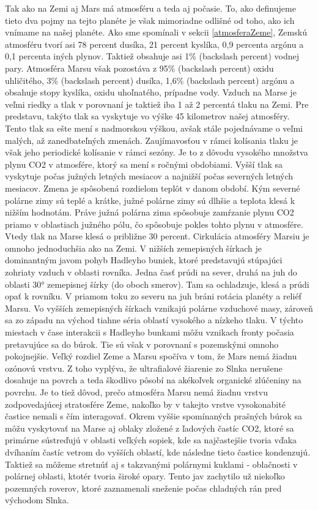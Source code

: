 Tak ako na Zemi aj Mars má atmosféru a teda aj počasie. To, ako definujeme tieto dva pojmy na tejto planéte je však mimoriadne odlišné od toho, ako ich vnímame na našej planéte. Ako sme spomínali v sekcii \ref{atmosferaZeme}, Zemskú atmosféru tvorí asi 78 percent dusíka, 21 percent kyslíka, 0,9 percenta argónu a 0,1 percenta iných plynov. Taktiež obsahuje asi 1\% (backslash percent) vodnej pary. Atmosféra Marsu však pozostáva z 95\% (backslash percent) oxidu uhličitého, 3\% (backslash percent) dusíka, 1,6\% (backslash percent) argónu a obsahuje stopy kyslíka, oxidu uhoľnatého, prípadne vody. Vzduch na Marse je veľmi riedky a tlak v porovnaní je taktiež iba 1 až 2 percentá tlaku na Zemi. Pre predstavu, takýto tlak sa vyskytuje vo výške 45 kilometrov našej atmosféry. Tento tlak sa ešte mení s nadmorskou výškou, avšak stále pojednávame o veľmi malých, až zanedbateľných zmenách. Zaujímavosťou v rámci kolísania tlaku je však jeho periodické kolísanie v rámci sezóny. Je to z dôvodu vysokého množstva plynu CO2 v atmosfére, ktorý sa mení s ročnými obdobiami. Vyšší tlak sa vyskytuje počas južných letných mesiacov a najnižší počas severných letných mesiacov. Zmena je spôsobená rozdielom teplôt v danom období. Kým severné polárne zimy sú teplé a krátke, južné polárne zimy sú dlhšie a teplota klesá k nižším hodnotám. Práve južná polárna zima spôsobuje zamŕzanie plynu CO2 priamo v oblastiach južného pólu, čo spôsobuje pokles tohto plynu v atmosfére. Vtedy tlak na Marse klesá o približne 30 percent.
Cirkulácia atmosféry Marsiu je omnoho jednoduchšia ako na Zemi. V nižších zemepisných šírkach je dominantným javom pohyb Hadleyho buniek, ktoré predstavujú stúpajúci zohriaty vzduch v oblasti rovníka. Jedna časť prúdi na sever, druhá na juh do oblasti 30° zemepisnej šírky (do oboch smerov). Tam sa ochladzuje, klesá a prúdi opať k rovníku. V priamom toku zo severu na juh bráni rotácia planéty a reliéf Marsu. Vo vyšších zemepisných šírkach vznikajú polárne vzduchové masy, zároveň sa zo západu na východ tiahne séria oblastí vysokého a nízkeho tlaku. V týchto miestach v čase interakcii s Hadleyho bunkami môžu vznikach fronty počasia pretavujúce sa do búrok. Tie sú však v porovnaní s pozemskými omnoho pokojnejšie.
Veľký rozdiel Zeme a Marsu spočíva v tom, že Mars nemá žiadnu ozónovú vrstvu. Z toho vyplýva, že ultrafialové žiarenie zo Slnka nerušene dosahuje na povrch a teda škodlivo pôsobí na akékoľvek organické zlúčeniny na povrchu. Je to tiež dôvod, prečo atmosféra Marsu nemá žiadnu vrstvu zodpovedajúcej stratosfére Zeme, nakoľko by v takejto vrstve vysokonabité častice nemali s čím interagovať. 
Okrem vyššie spomínaných prašných búrok sa môžu vyskytovať na Marse aj oblaky zložené z ľadových častíc CO2, ktoré sa primárne sústreďujú v oblasti veľkých sopiek, kde sa najčastejšie tvoria vďaka dvíhaním častíc vetrom do vyšších oblastí, kde následne tieto častice kondenzujú. Taktiež sa môžeme stretnúť aj s takzvanými polárnymi kuklami - oblačnosti v polárnej oblasti, ktotér tvoria široké opary. Tento jav zachytilo už niekoľko pozemných roverov, ktoré zaznamenali sneženie počas chladných rán pred východom Slnka. 

